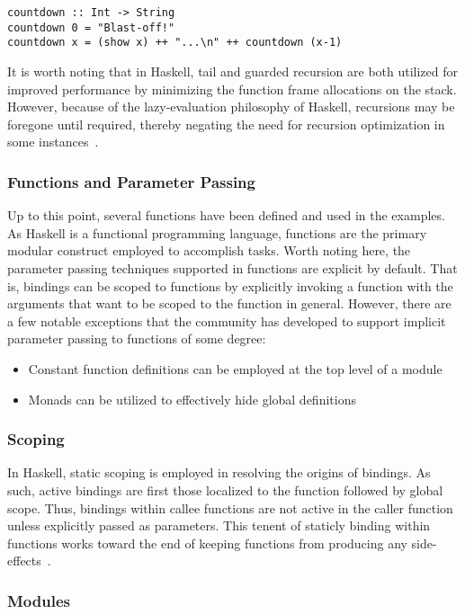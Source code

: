 \documentclass[titlepage,12pt]{article}
\newcommand{\bi}{\begin{itemize}}
\newcommand{\ei}{\end{itemize}}
\begin{document}
\begin{verbatim}
countdown :: Int -> String
countdown 0 = "Blast-off!"
countdown x = (show x) ++ "...\n" ++ countdown (x-1)
\end{verbatim}

It is worth noting that in Haskell, tail and guarded recursion are both utilized for improved performance 
by minimizing the function frame allocations on the stack.  However, because of the lazy-evaluation philosophy of Haskell,
recursions may be foregone until required, thereby negating the need for recursion optimization in some instances~\cite{haskell-tail-recur}.

\subsubsection{Functions and Parameter Passing}

Up to this point, several functions have been defined and used in the examples. As Haskell is a functional programming
language, functions are the primary modular construct employed to accomplish tasks. Worth noting here, the parameter passing techniques
supported in functions are explicit by default. That is, bindings can be scoped to functions by explicitly invoking a function
with the arguments that want to be scoped to the function in general. However, there are a few notable exceptions that the community
has developed to support implicit parameter passing to functions of some degree:
\bi
    \item Constant function definitions can be employed at the top level of a module~\cite{haskell-implicit-params}
    \item Monads can be utilized to effectively hide global definitions~\cite{haskell-implicit-params}
\ei

\subsubsection{Scoping}
In Haskell, static scoping is employed in resolving the origins of bindings.  As such, active bindings are first those localized
to the function followed by global scope.  Thus, bindings within callee functions are not active in the caller function
unless explicitly passed as parameters.  This tenent of staticly binding within functions
works toward the end of keeping functions from producing any side-effects~\cite{haskell-scope}.

\subsubsection{Modules}
\end{document}
